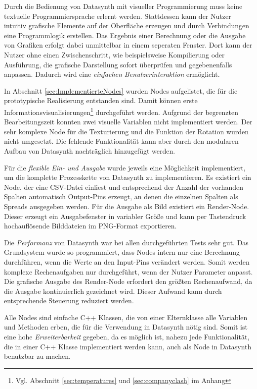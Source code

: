 \documentclass[a4paper, 
               12pt,
               DIV=calc,
               version=first,
               pdftex,
               headsepline,
               footsepline,
               bibtotocnumbered,
               liststotocnumbered]{scrreprt}
\begin{document}
Durch die Bedienung von Datasynth mit visueller Programmierung muss keine
textuelle Programmiersprache erlernt werden. Stattdessen kann der Nutzer intuitiv
grafische Elemente auf der Oberfläche erzeugen und durch Verbindungen
eine Programmlogik erstellen. Das Ergebnis einer Berechnung oder die Ausgabe von
Grafiken erfolgt dabei unmittelbar in einem seperaten Fenster. Dort kann der Nutzer
ohne einen Zwischenschritt, wie beispielsweise Kompilierung oder Ausführung,
die grafische Darstellung sofort überprüfen und gegebenenfalls anpassen. Dadurch wird eine
\textit{einfachen Benutzerinteraktion} ermöglicht.

In Abschnitt \ref{sec:ImplementierteNodes} wurden Nodes aufgelistet,
die für die prototypische Realisierung entstanden sind. Damit können erste Informationsvisualisierungen\footnote{Vgl. Abschnitt
\ref{sec:temperatures} und \ref{sec:companyclash} im Anhang} durchgeführt werden.
Aufgrund der begrenzten Bearbeitungszeit konnten zwei visuelle
Variablen nicht implementiert werden. Der sehr komplexe Node für die Texturierung
und die Funktion der Rotation wurden nicht umgesetzt. Die fehlende Funktionalität kann aber
durch den modularen Aufbau von Datasynth nachträglich hinzugefügt werden.

Für die \textit{flexible Ein- und Ausgabe} wurde jeweils eine Möglichkeit implementiert, um die komplette
Prozesskette von Datasynth zu implementieren. Es existiert ein Node, der eine
CSV-Datei einliest und entsprechend der Anzahl der vorhanden
Spalten automatisch Output-Pins erzeugt, an denen die einzelnen Spalten als
Spreads ausgegeben werden. Für die Ausgabe als Bild existiert ein Render-Node.
Dieser erzeugt ein Ausgabefenster in variabler Größe und kann per Tastendruck
hochauflösende Bilddateien im PNG-Format exportieren.

Die \textit{Performanz} von Datasynth war bei allen durchgeführten Tests sehr gut. Das Grundsystem wurde so
programmiert, dass Nodes intern nur eine Berechnung durchführen, wenn die Werte
an den Input-Pins verändert werden. Somit werden komplexe Rechenaufgaben nur
durchgeführt, wenn der Nutzer Parameter anpasst. Die grafische Ausgabe
des Render-Node erfordert den größten Rechenaufwand, da die Ausgabe kontinuierlich
gezeichnet wird. Dieser Aufwand kann durch entsprechende Steuerung
reduziert werden.

Alle Nodes sind einfache C++ Klassen, die von einer Elternklasse
alle Variablen und Methoden erben, die für die Verwendung in Datasynth
nötig sind. Somit ist eine hohe \textit{Erweiterbarkeit} gegeben, da es möglich ist,
nahezu jede Funktionalität, die in einer C++ Klasse implementiert werden kann, auch
als Node in Datasynth benutzbar zu machen.
\end{document}
